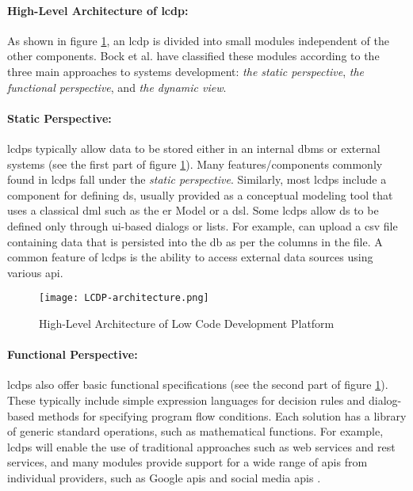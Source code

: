 \paragraph*{High-Level Architecture of \ac{lcdp}:}
As shown in figure \ref{fig:background:architecture}, an \ac{lcdp} is divided into small modules independent of the other components.
Bock et al. \cite{misc:lowcode:platforms} have classified these modules according to the three main approaches to systems development: \textit{the static perspective}, \textit{the functional perspective}, and \textit{the dynamic view}.

\paragraph*{Static Perspective:}
\ac{lcdp}s typically allow data to be stored either in an internal \ac{dbms} or external systems (see the first part of figure \ref{fig:background:architecture}). 
Many features/components commonly found in \ac{lcdp}s fall under the \textit{static perspective}. 
Similarly, most \ac{lcdp}s include a component for defining \ac{ds}, usually provided as a conceptual modeling tool that uses a classical \ac{dml} such as the \ac{er} Model or a \ac{dsl}. 
Some \ac{lcdp}s allow \ac{ds} to be defined only through \ac{ui}-based dialogs or lists.
For example, can upload a \ac{csv} file containing data that is persisted into the \ac{db} as per the columns in the file.
A common feature of \ac{lcdp}s is the ability to access external data sources using various \ac{api}.
\begin{figure}[htbp!]
  \centering
  \texttt{[image: LCDP-architecture.png]}
  \caption[LCDP Architecture]{High-Level Architecture of Low Code Development Platform}
  \label{fig:background:architecture}
\end{figure}
\paragraph*{Functional Perspective:}
\ac{lcdp}s also offer basic functional specifications (see the second part of figure \ref{fig:background:architecture}). 
These typically include simple expression languages for decision rules and dialog-based methods for specifying program flow conditions. 
Each solution has a library of generic standard operations, such as mathematical functions. 
For example, \ac{lcdp}s will enable the use of traditional approaches such as web services and \ac{rest} services, and many modules provide support for a wide range of \ac{api}s from individual providers, such as Google \ac{api}s and social media \ac{api}s \cite{misc:lowcode:platforms}.
